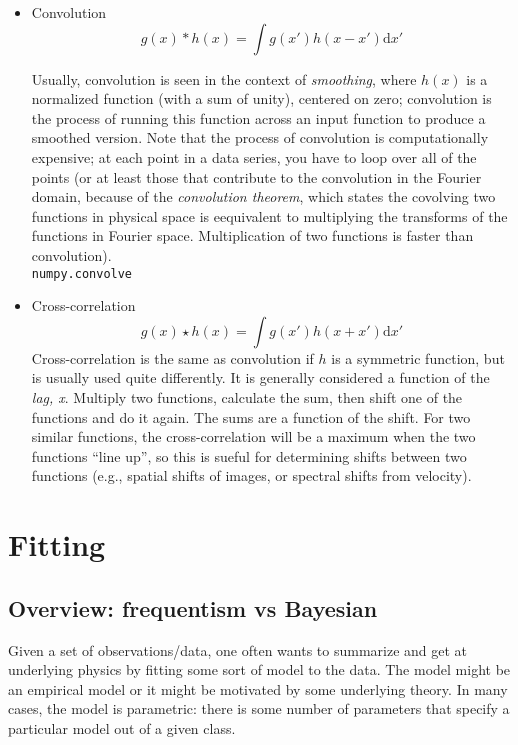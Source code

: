 \documentclass[12pt]{article}
\begin{document}
\begin{itemize}

    \item Convolution
\begin{equation*}
    g(x) * h(x) = \int g(x')h(x - x') \mathrm{d}x'
\end{equation*}

Usually, convolution is seen in the context of \emph{smoothing}, where $h(x)$ is
a normalized function (with a sum of unity), centered on zero; convolution is
the process of running this function across an input function to produce a
smoothed version. Note that the process of convolution is computationally
expensive; at each point in a data series, you have to loop over all of the
points (or at least those that contribute to the convolution in the Fourier
domain, because of the \emph{convolution theorem}, which states the covolving
two functions in physical space is eequivalent to multiplying the transforms
of the functions in Fourier space. Multiplication of two functions is faster
than convolution). \\

\texttt{numpy.convolve}

\item Cross-correlation
        $$ g(x) \star h(x) = \int g(x')h(x + x') \mathrm{d}x' $$
Cross-correlation is the same as convolution if $h$ is a symmetric function,
but is usually used quite differently. It is generally considered a function of
the \emph{lag, x}. Multiply two functions, calculate the sum, then shift one
of the functions and do it again. The sums are a function of the shift. For
two similar functions, the cross-correlation will be a maximum when the two
functions ``line up'', so this is sueful for determining shifts between two
functions (e.g., spatial shifts of images, or spectral shifts from velocity).
\end{itemize}

\newpage
\section{Fitting}

\subsection{Overview: frequentism vs Bayesian}
Given a set of observations/data, one often wants to summarize and get at
underlying physics by fitting some sort of model to the data. The model
might be an empirical model or it might be motivated by some underlying
theory. In many cases, the model is parametric: there is some number of
parameters that specify a particular model out of a given class.
\end{document}
